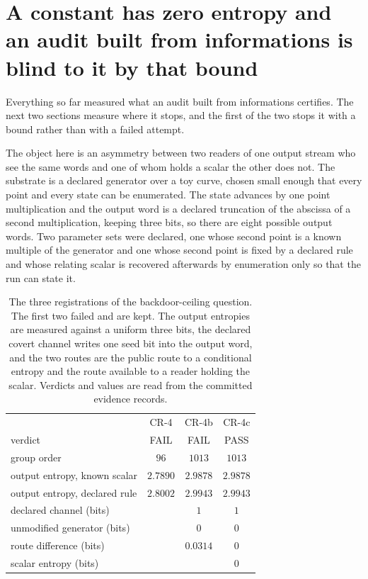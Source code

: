 \documentclass[aps,pre,reprint,nofootinbib]{revtex4-2}
\begin{document}
\section{A constant has zero entropy and an audit built from
informations is blind to it by that bound}
\label{sec:cr4}

Everything so far measured what an audit built from informations
certifies.  The next two sections measure where it stops, and the
first of the two stops it with a bound rather than with a failed
attempt.

The object here is an asymmetry between two readers of one output
stream who see the same words and one of whom holds a scalar the other
does not.  The substrate is a declared generator over a toy
curve, chosen small enough that every point and every state can be
enumerated.  The state advances by one point multiplication and the
output word is a declared truncation of the abscissa of a second
multiplication, keeping three bits, so there are eight possible output
words.
Two parameter sets were declared, one whose second point is a known
multiple of the generator and one whose second point is fixed by a
declared rule and whose relating scalar is recovered afterwards by
enumeration only so that the run can state it.

\begin{table}[t]
\caption{The three registrations of the backdoor-ceiling
question.  The first two failed and are kept.  The output entropies
are measured against a uniform three bits, the declared covert channel
writes one seed bit into the output word, and the two routes are the
public route to a conditional entropy and the route available to a
reader holding the scalar.  Verdicts and values are read from the
committed evidence records.}
\label{tab:cr4}
\begin{ruledtabular}
\footnotesize
\begin{tabular}{lccc}
             & CR-4    & CR-4b    & CR-4c \\
\colrule
verdict                       & FAIL   & FAIL     & PASS \\
group order                   & $96$   & $1013$   & $1013$ \\
output entropy, known scalar  & $2.7890$ & $2.9878$ & $2.9878$ \\
output entropy, declared rule & $2.8002$ & $2.9943$ & $2.9943$ \\
declared channel (bits)       &        & $1$      & $1$ \\
unmodified generator (bits)   &        & $0$      & $0$ \\
route difference (bits)       &        & $0.0314$ & $0$ \\
scalar entropy (bits)         &        &          & $0$ \\
\end{tabular}
\end{ruledtabular}
\end{table}
\end{document}
